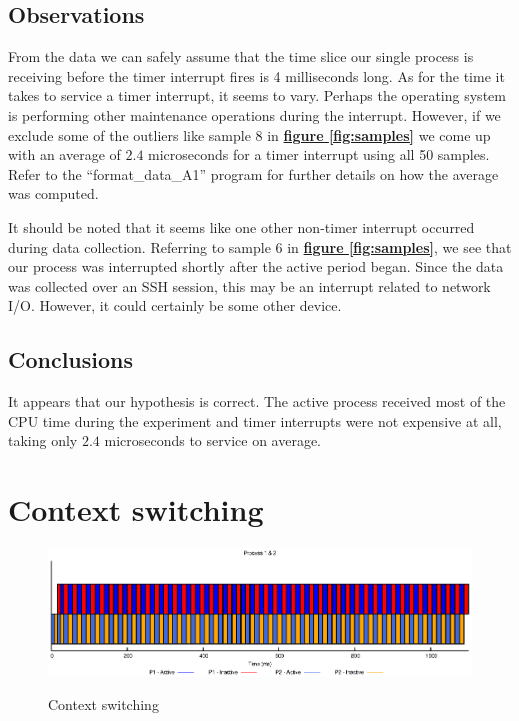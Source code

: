 \documentclass[oneside]{amsart}
\theoremstyle{definition}
\theoremstyle{remark}
\numberwithin{equation}{section}
\begin{document}
\subsection{Observations}
From the data we can safely assume that the time slice our single process is receiving before the
timer interrupt fires is 4 milliseconds long. As for the time it takes to service a timer interrupt,
it seems to vary. Perhaps the operating system is performing other maintenance operations during the
interrupt. However, if we exclude some of the outliers like sample 8 in
\hyperref[fig:samples]{\textbf{figure \ref*{fig:samples}}} we come up with an average of $2.4$
microseconds for a timer interrupt using all 50 samples. Refer to the ``format\_data\_A1'' program
for further details on how the average was computed.

It should be noted that it seems like one other non-timer interrupt occurred during data collection.
Referring to sample 6 in \hyperref[fig:samples]{\textbf{figure \ref*{fig:samples}}}, we see that our
process was interrupted shortly after the active period began. Since the data was collected over an
SSH session, this may be an interrupt related to network I/O. However, it could certainly be some
other device.

\subsection{Conclusions}
It appears that our hypothesis is correct. The active process received most of the CPU time during
the experiment and timer interrupts were not expensive at all, taking only $2.4$ microseconds to
service on average. \\

\newpage

\section{Context switching}
\begin{figure}[h]
    \caption{Context switching}
    \centering
    \includegraphics[scale=1]{A1P2.eps}
    \label{fig:plot}
\end{figure}

\end{document}
